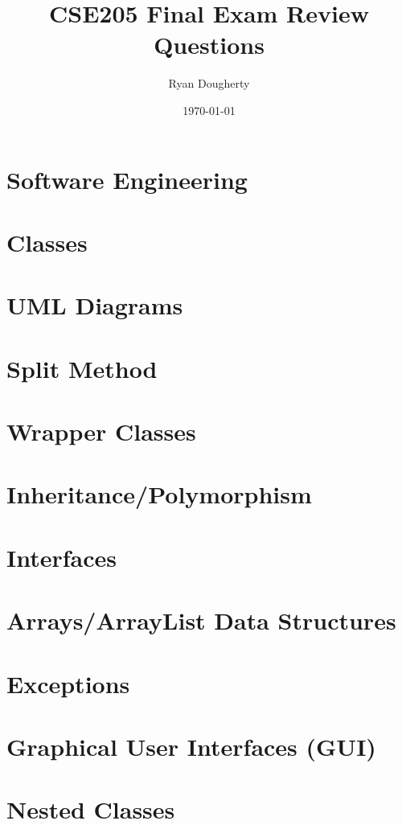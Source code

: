 \documentclass{article}
\title{CSE205 Final Exam Review Questions}
\author{Ryan Dougherty}
\date{\today}
\begin{document}
\maketitle

\section{Software Engineering}

\section{Classes}

\section{UML Diagrams}

\section{Split Method}

\section{Wrapper Classes}

\section{Inheritance/Polymorphism}

\section{Interfaces}

\section{Arrays/ArrayList Data Structures}

\newpage

\section{Exceptions}

\section{Graphical User Interfaces (GUI)}

\section{Nested Classes}
\end{document}
